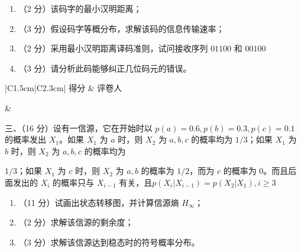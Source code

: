 \documentclass[UTF8,a4paper,12pt]{ctexart}
\begin{document}
\vspace{1.0em}

\begin{enumerate}[label=\arabic*., leftmargin=2em]
\item （2 分）该码字的最小汉明距离；
\item （3 分）假设码字等概分布，求解该码的信息传输速率；
\item （2 分）采用最小汉明距离译码准则，试问接收序列 $01100$ 和 $00100$
\item （3 分）请分析此码能够纠正几位码元的错误。
\end{enumerate}

\newpage

\noindent
\begin{minipage}[t]{0.26\textwidth}
\renewcommand{\arraystretch}{1.5}
\begin{tabular}{|C{1.5cm}|C{2.3cm}|}
\hline
得分 & 评卷人 \\
\hline
\rule{0pt}{0.8cm}&  \\
\hline
\end{tabular}
\end{minipage}
\hspace{0.02\textwidth}
\begin{minipage}[t]{0.7\textwidth}
{\heiti 三、（16 分）}设有一信源，它在开始时以
$p(a)=0.6, p(b)=0.3, p(c)=0.1$
的概率发出 $X_1$。如果 $X_1$ 为 $a$ 时，则 $X_2$ 为
$a,b,c$ 的概率均为 $1/3$；如果 $X_1$ 为 $b$ 时，则 $X_2$ 为
$a,b,c$ 的概率均为
\end{minipage}

 $1/3$；如果 $X_1$ 为 $c$ 时，则 $X_2$ 为 $a,b$ 的概率为 $1/2$，而为 $c$ 的概率为 $0$。而且后面发出的 $X_i$ 的概率只与 $X_{i-1}$ 有关，且$p(X_i|X_{i-1})=p(X_2|X_1),i\geq 3$
\begin{enumerate}[label=\arabic*., leftmargin=2em]
\item （11 分）试画出状态转移图，并计算信源熵 $H_\infty$；
\item （2 分）求解该信源的剩余度；
\item （3 分）求解该信源达到稳态时的符号概率分布。
\end{enumerate}

\newpage
\end{document}
